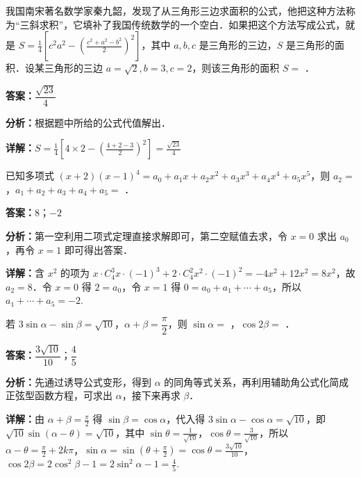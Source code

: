 \begin{question}[points=4]
我国南宋著名数学家秦九韶，发现了从三角形三边求面积的公式，他把这种方法称为“三斜求积”，它填补了我国传统数学的一个空白．如果把这个方法写成公式，就是 $S = \frac{1}{4}\left[c^2 a^2 - \left(\frac{c^2 + a^2 - b^2}{2}\right)^2\right]$，其中 $a,b,c$ 是三角形的三边，$S$ 是三角形的面积．设某三角形的三边 $a = \sqrt{2}, b = 3, c = 2$，则该三角形的面积 $S =$ ．
\begin{solution}
\textbf{答案：}$\dfrac{\sqrt{23}}{4}$

\textbf{分析：}根据题中所给的公式代值解出．

\textbf{详解：}$S = \frac{1}{4}\left[4\times2 - \left(\frac{4+2-3}{2}\right)^2\right] = \frac{\sqrt{23}}{4}$
\end{solution}
\end{question}

\begin{question}[points=6]
已知多项式 $(x+2)(x-1)^4 = a_0 + a_1 x + a_2 x^2 + a_3 x^3 + a_4 x^4 + a_5 x^5$，则 $a_2 =$ ，$a_1 + a_2 + a_3 + a_4 + a_5 =$ ．
\fillin[{$8$；$-2$}]
\begin{solution}
\textbf{答案：}$8$；$-2$

\textbf{分析：}第一空利用二项式定理直接求解即可，第二空赋值去求，令 $x=0$ 求出 $a_0$，再令 $x=1$ 即可得出答案．

\textbf{详解：}含 $x^2$ 的项为 $x\cdot C_4^3 x \cdot (-1)^3 + 2\cdot C_4^2 x^2 \cdot (-1)^2 = -4x^2+12x^2=8x^2$，故 $a_2=8$．令 $x=0$ 得 $2=a_0$，令 $x=1$ 得 $0=a_0+a_1+\cdots+a_5$，所以 $a_1+\cdots+a_5 = -2$.
\end{solution}
\end{question}

\begin{question}[points=6]
若 $3\sin\alpha - \sin\beta = \sqrt{10}$，$\alpha+\beta = \dfrac{\pi}{2}$，则 $\sin\alpha =$ ，$\cos 2\beta =$ ．
\begin{solution}
\textbf{答案：}$\dfrac{3\sqrt{10}}{10}$；$\dfrac{4}{5}$

\textbf{分析：}先通过诱导公式变形，得到 $\alpha$ 的同角等式关系，再利用辅助角公式化简成正弦型函数方程，可求出 $\alpha$，接下来再求 $\beta$．

\textbf{详解：}由 $\alpha+\beta=\frac{\pi}{2}$ 得 $\sin\beta = \cos\alpha$，代入得 $3\sin\alpha - \cos\alpha = \sqrt{10}$，即 $\sqrt{10}\sin(\alpha-\theta)=\sqrt{10}$，其中 $\sin\theta=\frac{1}{\sqrt{10}}$，$\cos\theta=\frac{3}{\sqrt{10}}$，所以 $\alpha-\theta = \frac{\pi}{2}+2k\pi$，$\sin\alpha = \sin(\theta+\frac{\pi}{2}) = \cos\theta = \frac{3\sqrt{10}}{10}$，$\cos2\beta = 2\cos^2\beta-1 = 2\sin^2\alpha-1 = \frac{4}{5}$.
\end{solution}
\end{question}

